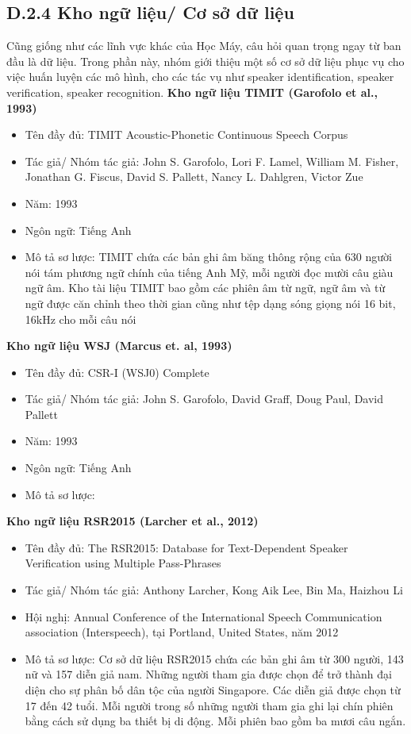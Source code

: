 \documentclass{article}
\begin{document}
	\subsection{D.2.4 Kho ngữ liệu/ Cơ sở dữ liệu}
	\qquad Cũng giống như các lĩnh vực khác của Học Máy, câu hỏi quan trọng ngay từ ban đầu là dữ liệu. Trong phần này, nhóm giới thiệu một số cơ sở dữ liệu phục vụ cho việc huấn luyện các mô hình, cho các tác vụ như speaker identification, speaker verification, speaker recognition.\newline
	\textbf{Kho ngữ liệu TIMIT (Garofolo et al., 1993)}
	\begin{itemize}
		\item Tên đầy đủ: TIMIT Acoustic-Phonetic Continuous Speech Corpus
		\item Tác giả/ Nhóm tác giả: 	John S. Garofolo, Lori F. Lamel, William M. Fisher, Jonathan G. Fiscus, David S. Pallett, Nancy L. Dahlgren, Victor Zue
		\item Năm: 1993
		\item Ngôn ngữ: Tiếng Anh
		\item Mô tả sơ lược: TIMIT chứa các bản ghi âm băng thông rộng của 630 người nói tám phương ngữ chính của tiếng Anh Mỹ, mỗi người đọc mười câu giàu ngữ âm. Kho tài liệu TIMIT bao gồm các phiên âm từ ngữ, ngữ âm và từ ngữ được căn chỉnh theo thời gian cũng như tệp dạng sóng giọng nói 16 bit, 16kHz cho mỗi câu nói
	\end{itemize}	
	\textbf{Kho ngữ liệu WSJ (Marcus et. al, 1993)}
	\begin{itemize}
		\item Tên đầy đủ: CSR-I (WSJ0) Complete
		\item Tác giả/ Nhóm tác giả: John S. Garofolo, David Graff, Doug Paul, David Pallett
		\item Năm: 1993
		\item Ngôn ngữ: Tiếng Anh
		\item Mô tả sơ lược: 
	\end{itemize}	
	\textbf{Kho ngữ liệu RSR2015 (Larcher et al., 2012)}
	\begin{itemize}
		\item Tên đầy đủ: The RSR2015: Database for Text-Dependent Speaker Verification using Multiple Pass-Phrases
		\item Tác giả/ Nhóm tác giả: Anthony Larcher, Kong Aik Lee, Bin Ma, Haizhou Li
		\item Hội nghị: Annual Conference of the International Speech
		Communication association (Interspeech), tại Portland, United States, năm 2012
		\item Mô tả sơ lược: Cơ sở dữ liệu RSR2015 chứa các bản ghi âm từ 300 người, 143 nữ và 157 diễn giả nam. Những người tham gia được chọn để trở thành đại diện cho sự phân bố dân tộc của người Singapore. Các diễn giả được chọn từ 17 đến 42 tuổi. Mỗi người trong số những người tham gia ghi lại chín phiên bằng cách sử dụng ba thiết bị di động. Mỗi phiên bao gồm ba mươi câu ngắn.
	\end{itemize}
\end{document}
